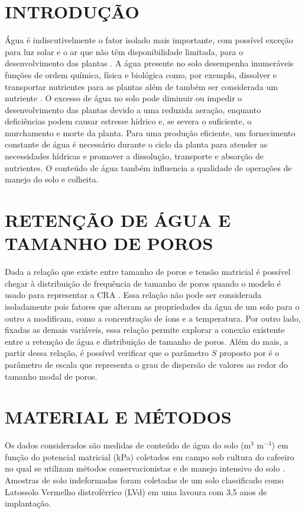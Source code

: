 \section{INTRODUÇÃO}

Água é indiscutivelmente o fator isolado mais importante, com possível
exceção para luz solar e o ar que não têm disponibilidade limitada,
para o desenvolvimento das plantas \cite{Chesworth2007}.  A água
presente no solo desempenha inumeráveis funções de ordem química,
física e biológica como, por exemplo, dissolver e transportar
nutrientes para as plantas além de também ser considerada um nutriente
\cite{Brady2009}.  O excesso de água no solo pode diminuir ou impedir
o desenvolvimento das plantas devido a uma reduzida aeração, enquanto
deficiências podem causar estresse hídrico e, se severa o suficiente,
o murchamento e morte da planta. Para uma produção eficiente, um
fornecimento constante de água é necessário durante o ciclo da planta
para atender as necessidades hídricas e promover a dissolução,
transporte e absorção de nutrientes. O conteúdo de água também
influencia a qualidade de operações de manejo do solo e colheita.

\newpage
\section{RETENÇÃO DE ÁGUA E TAMANHO DE POROS}\label{sc-craporos}

Dada a relação que existe entre tamanho de poros e tensão matricial
é possível chegar à distribuição de frequência
de tamanho de poros quando o modelo  é
usado para representar a CRA \cite{Reynolds2002a}. Essa relação não
pode ser considerada isoladamente pois fatores que alteram as
propriedades da água de um solo para o outro a modificam, como a
concentração de íons e a temperatura. Por outro lado, fixadas as
demais variáveis, essa relação permite explorar a conexão existente
entre a retenção de água e distribuição de tamanho de poros. Além do
mais, a partir dessa relação, é possível verificar que o parâmetro $S$
proposto por  é o parâmetro de escala que
representa o grau de dispersão de valores ao redor do tamanho modal de
poros.

\newpage
\section{MATERIAL E MÉTODOS}\label{sc-methods}

Os dados considerados são medidas de conteúdo de água do solo (m$^3$
m$^{-3}$) em função do potencial matricial (kPa) coletados em campo
sob cultura do cafeeiro no qual se utilizam métodos conservacionistas
e de manejo intensivo do solo \cite{Serafim2011}. Amostras de solo
indeformadas foram coletadas de um solo classificado como Latossolo
Vermelho distroférrico (LVd) em uma lavoura com 3,5 anos de
implantação.

